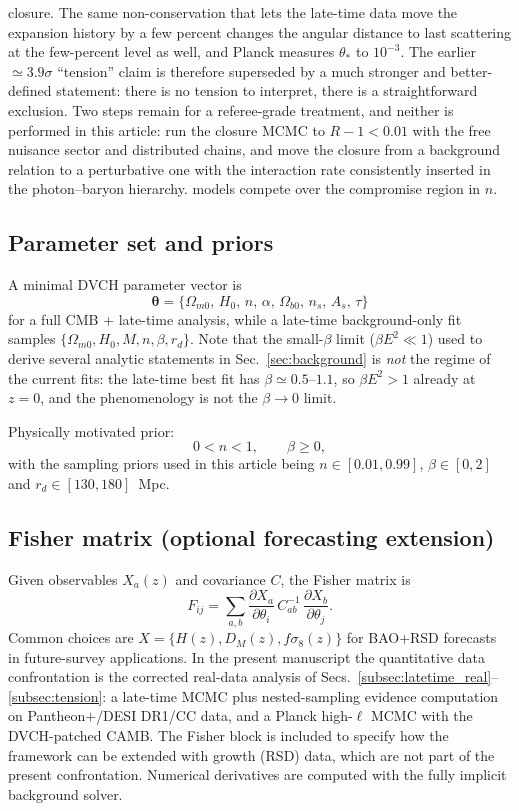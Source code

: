 \documentclass[pdflatex,sn-mathphys-num]{sn-jnl}%
\newcommand{\Omm}{\Omega_{m0}}
\begin{document}
closure. The same non-conservation that lets the late-time data move the
expansion history by a few percent changes the angular distance to last
scattering at the few-percent level as well, and Planck measures
$\theta_*$ to $10^{-3}$. The earlier $\simeq3.9\sigma$ ``tension'' claim
is therefore superseded by a much stronger and better-defined statement:
there is no tension to interpret, there is a straightforward exclusion.
Two steps remain for a referee-grade treatment, and neither is performed
in this article: run the closure MCMC to $R-1<0.01$ with the free
nuisance sector and distributed chains, and move the closure from a
background relation to a perturbative one with the interaction rate
consistently inserted in the photon--baryon hierarchy.
models compete over the compromise region in $n$.

\subsection{Parameter set and priors}
\label{subsec:priors}

A minimal DVCH parameter vector is
\begin{equation}
\bm{\theta} = \{ \Omm,\,H_0,\,n,\,\alpha,\,\Omega_{b0},\,n_s,\,A_s,\,\tau \}
\end{equation}
for a full CMB + late-time analysis, while a late-time background-only fit
samples $\{\Omm,H_0,M,n,\beta,r_d\}$. Note that the small-$\beta$ limit
($\beta E^2\ll1$) used to derive several analytic statements in
Sec.~\ref{sec:background} is \emph{not} the regime of the current fits:
the late-time best fit has $\beta\simeq0.5$--$1.1$, so $\beta E^2>1$ already
at $z=0$, and the phenomenology is not the $\beta\to0$ limit.

Physically motivated prior:
\begin{equation}
0<n<1,\qquad \beta\ge 0,
\end{equation}
with the sampling priors used in this article being
$n\in[0.01,0.99]$, $\beta\in[0,2]$ and $r_d\in[130,180]$~Mpc.

\subsection{Fisher matrix (optional forecasting extension)}
\label{subsec:fisher}

Given observables $X_a(z)$ and covariance $C$, the Fisher matrix is
\begin{equation}
F_{ij} = \sum_{a,b}\frac{\partial X_a}{\partial\theta_i}\,
C^{-1}_{ab}\,
\frac{\partial X_b}{\partial\theta_j}.
\end{equation}
Common choices are $X=\{H(z),D_M(z),f\sigma_8(z)\}$ for BAO+RSD forecasts in
future-survey applications. In the present manuscript the quantitative data
confrontation is the corrected real-data analysis of
Secs.~\ref{subsec:latetime_real}--\ref{subsec:tension}: a late-time MCMC plus
nested-sampling evidence computation on Pantheon$+$/DESI DR1/CC data, and a
Planck high-$\ell$ MCMC with the DVCH-patched CAMB. The Fisher block is
included to specify how the framework can be extended with growth (RSD) data,
which are not part of the present confrontation. Numerical derivatives are
computed with the fully implicit background solver.
\end{document}
